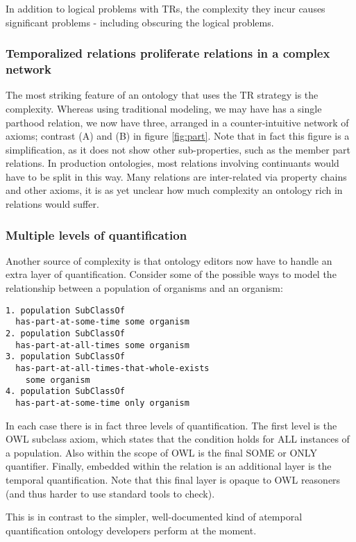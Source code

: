 \documentclass{bioinfo}
\begin{document}
In addition to logical problems with TRs, the complexity they incur
causes significant problems - including obscuring the logical
problems.

\subsubsection{Temporalized relations proliferate relations in a complex network}

The most striking feature of an ontology that uses the TR strategy is
the complexity. Whereas using traditional modeling, we may have has a
single parthood relation, we now have three, arranged in a
counter-intuitive network of axioms; contrast (A) and (B) in figure
\ref{fig:part}. Note that in fact this figure is a simplification, as
it does not show other sub-properties, such as the member part
relations. In production ontologies, most relations involving
continuants would have to be split in this way. Many relations are
inter-related via property chains and other axioms, it is as yet
unclear how much complexity an ontology rich in relations would
suffer.

\subsubsection{Multiple levels of quantification}

Another source of complexity is that ontology editors now have to
handle an extra layer of quantification. Consider some of the possible
ways to model the relationship between a population of organisms and
an organism:

\begin{verbatim}
1. population SubClassOf 
  has-part-at-some-time some organism
2. population SubClassOf 
  has-part-at-all-times some organism
3. population SubClassOf 
  has-part-at-all-times-that-whole-exists
    some organism
4. population SubClassOf 
  has-part-at-some-time only organism
\end{verbatim}

In each case there is in fact three levels of quantification. The
first level is the OWL subclass axiom, which states that the condition
holds for ALL instances of a population. Also within the scope of OWL
is the final SOME or ONLY quantifier. Finally, embedded within the
relation is an additional layer is the temporal quantification. Note
that this final layer is opaque to OWL reasoners (and thus harder to
use standard tools to check).

This is in contrast to the simpler, well-documented kind of atemporal
quantification ontology developers perform at the moment.
\end{document}
